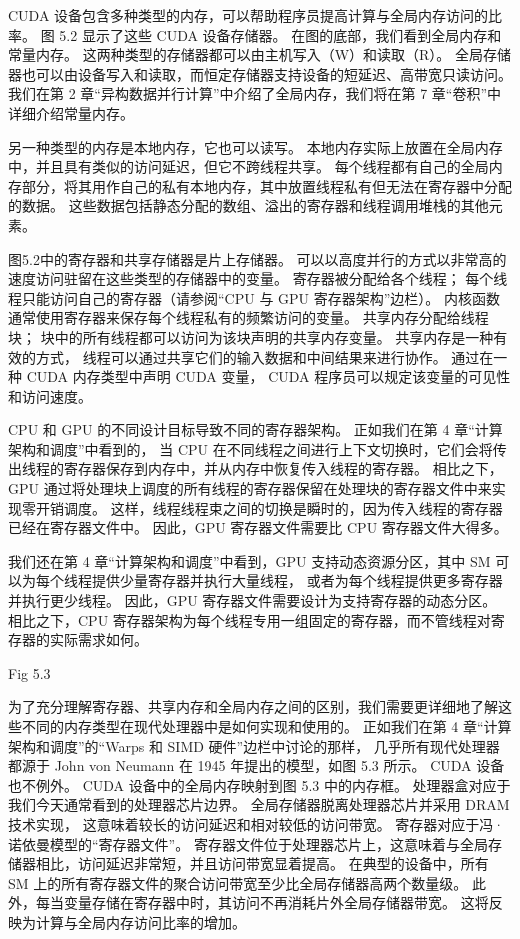 CUDA 设备包含多种类型的内存，可以帮助程序员提高计算与全局内存访问的比率。 图 5.2 显示了这些 CUDA 设备存储器。 
在图的底部，我们看到全局内存和常量内存。 这两种类型的存储器都可以由主机写入（W）和读取（R）。 
全局存储器也可以由设备写入和读取，而恒定存储器支持设备的短延迟、高带宽只读访问。 
我们在第 2 章“异构数据并行计算”中介绍了全局内存，我们将在第 7 章“卷积”中详细介绍常量内存。

另一种类型的内存是本地内存，它也可以读写。 本地内存实际上放置在全局内存中，并且具有类似的访问延迟，但它不跨线程共享。 
每个线程都有自己的全局内存部分，将其用作自己的私有本地内存，其中放置线程私有但无法在寄存器中分配的数据。 
这些数据包括静态分配的数组、溢出的寄存器和线程调用堆栈的其他元素。

图5.2中的寄存器和共享存储器是片上存储器。 可以以高度并行的方式以非常高的速度访问驻留在这些类型的存储器中的变量。 
寄存器被分配给各个线程； 每个线程只能访问自己的寄存器（请参阅“CPU 与 GPU 寄存器架构”边栏）。 
内核函数通常使用寄存器来保存每个线程私有的频繁访问的变量。 共享内存分配给线程块； 
块中的所有线程都可以访问为该块声明的共享内存变量。 共享内存是一种有效的方式，
线程可以通过共享它们的输入数据和中间结果来进行协作。 通过在一种 CUDA 内存类型中声明 CUDA 变量，
CUDA 程序员可以规定该变量的可见性和访问速度。

\begin{remark}
CPU 和 GPU 的不同设计目标导致不同的寄存器架构。 正如我们在第 4 章“计算架构和调度”中看到的，
当 CPU 在不同线程之间进行上下文切换时，它们会将传出线程的寄存器保存到内存中，并从内存中恢复传入线程的寄存器。 
相比之下，GPU 通过将处理块上调度的所有线程的寄存器保留在处理块的寄存器文件中来实现零开销调度。 
这样，线程线程束之间的切换是瞬时的，因为传入线程的寄存器已经在寄存器文件中。 
因此，GPU 寄存器文件需要比 CPU 寄存器文件大得多。

我们还在第 4 章“计算架构和调度”中看到，GPU 支持动态资源分区，其中 SM 可以为每个线程提供少量寄存器并执行大量线程，
或者为每个线程提供更多寄存器并执行更少线程。 因此，GPU 寄存器文件需要设计为支持寄存器的动态分区。 
相比之下，CPU 寄存器架构为每个线程专用一组固定的寄存器，而不管线程对寄存器的实际需求如何。
\end{remark}

{\color{red} Fig 5.3}

为了充分理解寄存器、共享内存和全局内存之间的区别，我们需要更详细地了解这些不同的内存类型在现代处理器中是如何实现和使用的。 
正如我们在第 4 章“计算架构和调度”的“Warps 和 SIMD 硬件”边栏中讨论的那样，
几乎所有现代处理器都源于 John von Neumann 在 1945 年提出的模型，如图 5.3 所示。 
CUDA 设备也不例外。 CUDA 设备中的全局内存映射到图 5.3 中的内存框。 
处理器盒对应于我们今天通常看到的处理器芯片边界。 全局存储器脱离处理器芯片并采用 DRAM 技术实现，
这意味着较长的访问延迟和相对较低的访问带宽。 寄存器对应于冯·诺依曼模型的“寄存器文件”。 
寄存器文件位于处理器芯片上，这意味着与全局存储器相比，访问延迟非常短，并且访问带宽显着提高。 
在典型的设备中，所有 SM 上的所有寄存器文件的聚合访问带宽至少比全局存储器高两个数量级。 
此外，每当变量存储在寄存器中时，其访问不再消耗片外全局存储器带宽。 这将反映为计算与全局内存访问比率的增加。


